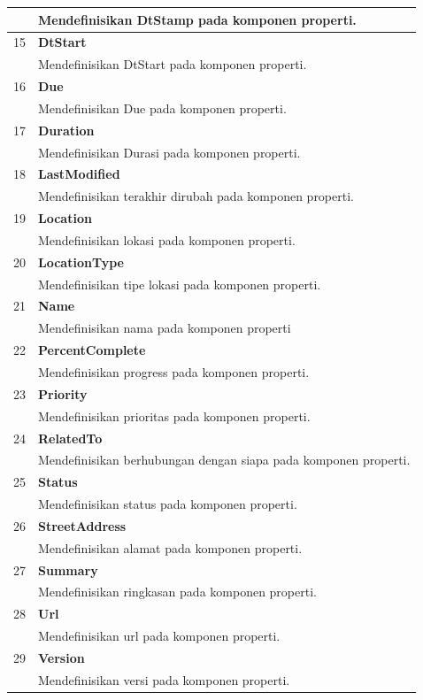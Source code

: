 {\begin{tabular}{|c|p{12cm}|}
			&	Mendefinisikan DtStamp pada komponen properti.\\ \hline
		15 & \textbf{DtStart}\\
			&	Mendefinisikan DtStart pada komponen properti.\\ \hline
		16 & \textbf{Due}\\
			&	Mendefinisikan Due pada komponen properti.\\ \hline
		17 & \textbf{Duration}\\
			&	Mendefinisikan Durasi pada komponen properti.\\ \hline
		18 & \textbf{LastModified}\\
			&	Mendefinisikan terakhir dirubah pada komponen properti.\\ \hline
		19 & \textbf{Location}\\
			&	Mendefinisikan lokasi pada komponen properti.\\ \hline
		20 & \textbf{LocationType}\\
			&	Mendefinisikan tipe lokasi pada komponen properti.\\ \hline
		21 & \textbf{Name}\\
			&	Mendefinisikan nama pada komponen properti\\ \hline
		22 & \textbf{PercentComplete}\\
			&	Mendefinisikan progress pada komponen properti.\\ \hline
		23 & \textbf{Priority}\\
			&	Mendefinisikan prioritas pada komponen properti.\\ \hline
		24 & \textbf{RelatedTo}\\
			&	Mendefinisikan berhubungan dengan siapa pada komponen properti.\\ \hline
		25 & \textbf{Status}\\
			&	Mendefinisikan status pada komponen properti.\\ \hline
		26 & \textbf{StreetAddress}\\
			&	Mendefinisikan alamat pada komponen properti.\\ \hline
		27 & \textbf{Summary}\\
			&	Mendefinisikan ringkasan pada komponen properti.\\ \hline
		28 & \textbf{Url}\\
			&	Mendefinisikan url pada komponen properti.\\ \hline
		29 & \textbf{Version}\\
			&	Mendefinisikan versi pada komponen properti.\\ \hline	
	\end{tabular}}

